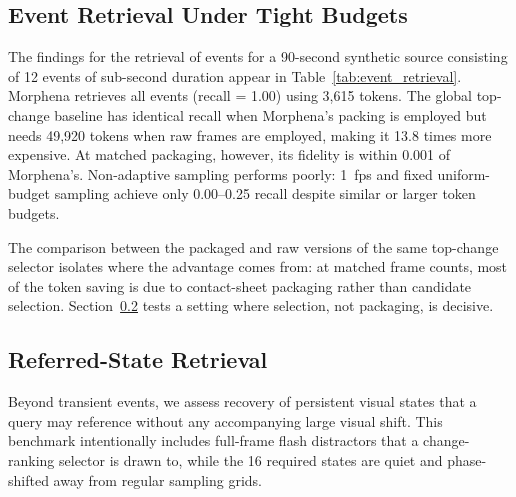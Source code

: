\documentclass[conference]{IEEEtran}
\begin{document}
\subsection{Event Retrieval Under Tight Budgets}
The findings for the retrieval of events for a 90-second synthetic source consisting of 12 events of sub-second duration appear in Table~\ref{tab:event_retrieval}. Morphena retrieves all events (recall = 1.00) using 3,615 tokens. The global top-change baseline has identical recall when Morphena's packing is employed but needs 49,920 tokens when raw frames are employed, making it 13.8 times more expensive. At matched packaging, however, its fidelity is within 0.001 of Morphena's. Non-adaptive sampling performs poorly: 1~fps and fixed uniform-budget sampling achieve only 0.00--0.25 recall despite similar or larger token budgets.

\begin{table}[t]
\centering
\small
\caption{Event retrieval on a 12-event synthetic source. Utility is the editorial fidelity proxy (Eq.~\ref{eq:fidelity}).}
\label{tab:event_retrieval}
\end{table}

The comparison between the packaged and raw versions of the same top-change selector isolates where the advantage comes from: at matched frame counts, most of the token saving is due to contact-sheet packaging rather than candidate selection. Section~\ref{sec:referred_state} tests a setting where selection, not packaging, is decisive.

\subsection{Referred-State Retrieval}
\label{sec:referred_state}
Beyond transient events, we assess recovery of persistent visual states that a query may reference without any accompanying large visual shift. This benchmark intentionally includes full-frame flash distractors that a change-ranking selector is drawn to, while the 16 required states are quiet and phase-shifted away from regular sampling grids.
\end{document}
